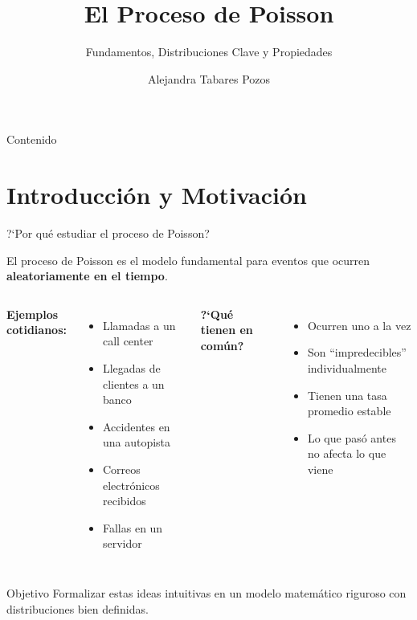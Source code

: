 \documentclass[aspectratio=1610, 9pt]{beamer}
\title[Proceso de Poisson]{El Proceso de Poisson}
\subtitle{Fundamentos, Distribuciones Clave y Propiedades}
\author{Alejandra Tabares Pozos}
\institute{Universidad de los Andes \\
 Departamento de Ingeniería Industrial}
\date{}
\begin{document}
\begin{frame}
\titlepage
\end{frame}

\begin{frame}{Contenido}
\tableofcontents
\end{frame}

\section{Introducci\'{o}n y Motivaci\'{o}n}

\begin{frame}{?`Por qu\'{e} estudiar el proceso de Poisson?}

El proceso de Poisson es el modelo fundamental para eventos que ocurren \textbf{aleatoriamente en el tiempo}.

\vspace{0.4cm}
\begin{columns}
\textbf{Ejemplos cotidianos:}
\begin{itemize}
    \item Llamadas a un call center
    \item Llegadas de clientes a un banco
    \item Accidentes en una autopista
    \item Correos electr\'{o}nicos recibidos
    \item Fallas en un servidor
\end{itemize}

\textbf{?`Qu\'{e} tienen en com\'{u}n?}
\begin{itemize}
    \item Ocurren uno a la vez
    \item Son ``impredecibles'' individualmente
    \item Tienen una tasa promedio estable
    \item Lo que pas\'{o} antes no afecta lo que viene
\end{itemize}
\end{columns}

\vspace{0.4cm}
\begin{block}{Objetivo}
Formalizar estas ideas intuitivas en un modelo matem\'{a}tico riguroso con distribuciones bien definidas.
\end{block}
\end{frame}
\end{document}

